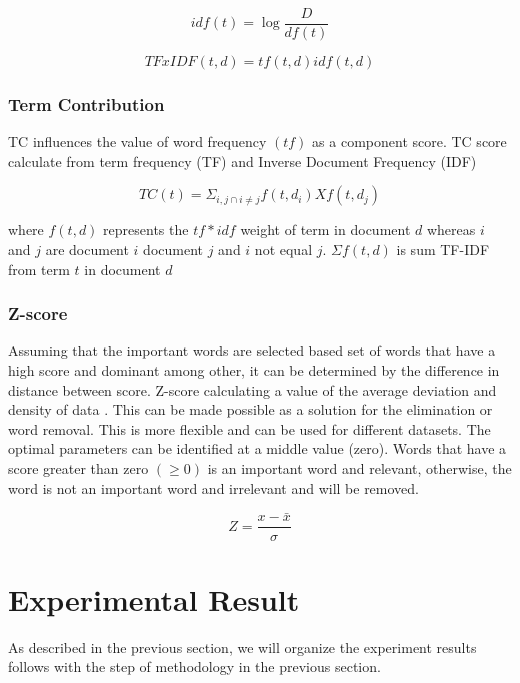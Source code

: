 \documentclass[conference]{IEEEtran}
\begin{document}
\begin{equation}
	\label{eq:idf}
    idf(t) = \log  \frac{D}{df(t)}
\end{equation}

\begin{equation}
	\label{eq:tf-idf}
    TFxIDF(t,d) = tf(t,d) idf(t,d)
\end{equation}



\subsubsection{Term Contribution}
TC influences the value of word frequency \((tf)\) as a component score. TC score calculate from term frequency (TF) and Inverse Document Frequency (IDF) \cite{Liu}

\begin{equation}
	\label{eq:TC_score}
    TC(t) = \Sigma_{i,j \cap i \neq j} f(t,d_{i}) X f(t,d_{j})
\end{equation}

where \(f(t,d)\) represents the \(tf*idf\) weight of term in document \(d\) whereas \(i\) and \(j\) are document \(i\) document \(j\) and \(i\) not equal \(j\). \(\Sigma f(t,d)\) is sum TF-IDF from term \(t\) in document \(d\)

\subsubsection{Z-score}
Assuming that the important words are selected based set of words that have a high score and dominant among other, it can be determined by the difference in distance between score. Z-score calculating a value of the average deviation and density of data \cite{Olga}. This can be made possible as a solution for the elimination or  word removal. This is more flexible and can be used for different datasets. The optimal parameters can be identified at a middle value (zero). Words that have a score greater than zero \((\geq 0)\) is an important word and relevant, otherwise,  the word is not an important word and irrelevant and will be removed.

\begin{equation}
	\label{eq:Z_score}
    Z = \frac{x - \bar{x}}{\sigma}
\end{equation}

\section{Experimental Result}
As described in the previous section, we will organize the experiment results follows with the step of methodology in the previous section.
\end{document}

